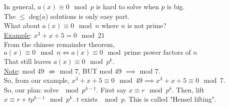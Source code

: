   In general, $a(x) \equiv 0 \mod p$ is hard to solve when $p$ is big.\\
  The $\le$ deg($a$) solutions is only easy part.\\
  What about $a(x) \equiv 0 \mod n$ where $n$ is not prime?\\
  \underline{Example}: $x^3 + x + 5 = 0 \mod 21$\\
  From the chinese remainder theorem, $a(x) \equiv 0 \mod n \Leftrightarrow
  a(x) \equiv 0 \mod \text{prime power factors of $n$}$\\
  That still leaves $a(x) \equiv 0 \mod p^k$.\\
  \underline{Note}: mod 49 $\not\Leftrightarrow$ mod 7, BUT mod 49 $\implies$
  mod 7.\\
  So, from our example, $x^3 + x + 5 \equiv 0 \mod 49 \implies x^3 + x + 5
  \equiv 0 \mod 7$.\\
  So, our plan: solve $\mod p^{k-1}$. First say $x \equiv r \mod p^k$. Then,
  lift $x \equiv r + tp^{k-1} \mod p^k$. $t$ exists $\mod p$. This is called
  "Hensel lifting".\\\\
   \\\\

